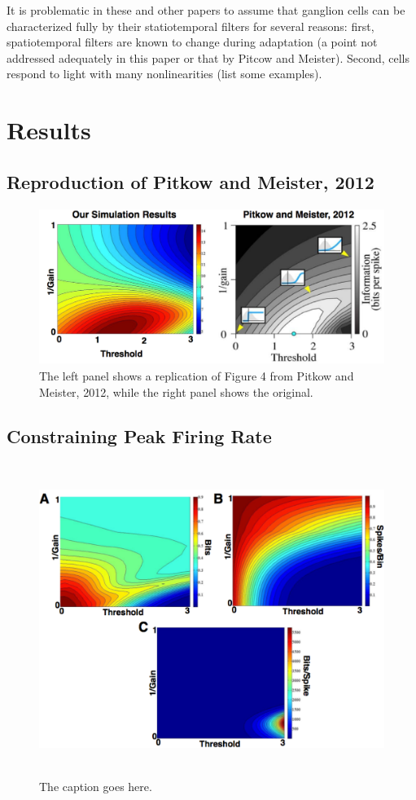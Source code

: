 \documentclass[12pt]{article}
\begin{document}
It is problematic in these and other papers to assume that ganglion cells can be characterized fully by their statiotemporal filters for several reasons: first, spatiotemporal filters are known to change during adaptation (a point not addressed adequately in this paper or that by Pitcow and Meister). Second, cells respond to light with many nonlinearities (list some examples). 

\section{Results}

\subsection{Reproduction of Pitkow and Meister, 2012}

\begin{figure}[h!!]
\centerline{\includegraphics*[height = 2.0in,width=5.0in,angle=0]{ReplicationOf4f.pdf}}
\label{Figure 1}
\caption{The left panel shows a replication of Figure 4 from Pitkow and Meister, 2012, while the right panel shows the original. }
\end{figure}

\subsection{Constraining Peak Firing Rate}

\begin{figure}[h!!]
\centerline{\includegraphics*[height = 4.0in,width=5.0in,angle=0]{Figure4PeakFR.pdf}}
\label{Figure 2}
\caption{The caption goes here. }
\end{figure}
\end{document}
